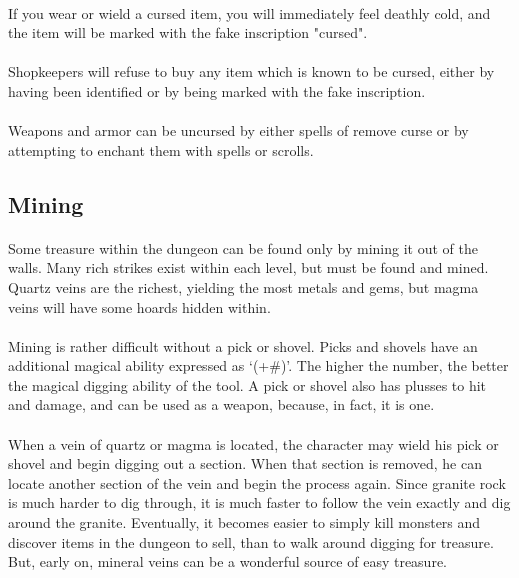 \paragraph{}If you wear or wield a cursed item, you will immediately
feel deathly cold, and the item will be marked with the fake inscription
"cursed".

\paragraph{}Shopkeepers will refuse to buy any item which is known to be
cursed, either by having been identified or by being marked with the
fake inscription.

\paragraph{}Weapons and armor can be uncursed by either spells of remove
curse or by attempting to enchant them with spells or scrolls.

\subsection{Mining}
\paragraph{}Some treasure within the dungeon can be found only by mining
it out of the walls. Many rich strikes exist within each level, but must
be found and mined. Quartz veins are the richest, yielding the most
metals and gems, but magma veins will have some hoards hidden within.

\paragraph{}Mining is rather difficult without a pick or shovel. Picks
and shovels have an additional magical ability expressed as `(+\#)'. The
higher the number, the better the magical digging ability of the tool. A
pick or shovel also has plusses to hit and damage, and can be used as a
weapon, because, in fact, it is one.

\paragraph{}When a vein of quartz or magma is located, the character may
wield his pick or shovel and begin digging out a section. When that
section is removed, he can locate another section of the vein and begin
the process again. Since granite rock is much harder to dig through, it
is much faster to follow the vein exactly and dig around the granite.
Eventually, it becomes easier to simply kill monsters and discover items
in the dungeon to sell, than to walk around digging for treasure. But,
early on, mineral veins can be a wonderful source of easy treasure.

